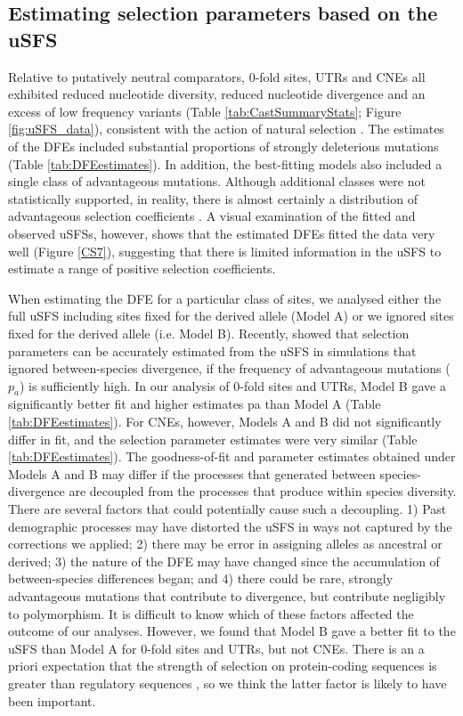 \subsection{Estimating selection parameters based on the uSFS}

	Relative to putatively neutral comparators, 0-fold sites, UTRs and CNEs all exhibited reduced nucleotide diversity, reduced nucleotide divergence and an excess of low frequency variants (Table \ref{tab:CastSummaryStats}; Figure \ref{fig:uSFS_data}), consistent with the action of natural selection \citep{RN158, RN122}. The estimates of the DFEs included substantial proportions of strongly deleterious mutations (Table \ref{tab:DFEestimates}). In addition, the best-fitting models also included a single class of advantageous mutations. Although additional classes were not statistically supported, in reality, there is almost certainly a distribution of advantageous selection coefficients \citep{RN181, RN345}. A visual examination of the fitted and observed uSFSs, however, shows that the estimated DFEs fitted the data very well (Figure \ref{CS7}), suggesting that there is limited information in the uSFS to estimate a range of positive selection coefficients. 

	When estimating the DFE for a particular class of sites, we analysed either the full uSFS including sites fixed for the derived allele (Model A) or we ignored sites fixed for the derived allele (i.e. Model B). Recently,\cite{RN354} showed that selection parameters can be accurately estimated from the uSFS in simulations that ignored between-species divergence, if the frequency of advantageous mutations ($p_a$) is sufficiently high. In our analysis of 0-fold sites and UTRs, Model B gave a significantly better fit and higher estimates pa than Model A (Table \ref{tab:DFEestimates}). For CNEs, however, Models A and B did not significantly differ in fit, and the selection parameter estimates were very similar (Table \ref{tab:DFEestimates}). The goodness-of-fit and parameter estimates obtained under Models A and B may differ if the processes that generated between species-divergence are decoupled from the processes that produce within species diversity. There are several factors that could potentially cause such a decoupling. 1) Past demographic processes may have distorted the uSFS in ways not captured by the corrections we applied; 2) there may be error in assigning alleles as ancestral or derived; 3) the nature of the DFE may have changed since the accumulation of between-species differences began; and 4) there could be rare, strongly advantageous mutations that contribute to divergence, but contribute negligibly to polymorphism. It is difficult to know which of these factors affected the outcome of our analyses. However, we found that Model B gave a better fit to the uSFS than Model A for 0-fold sites and UTRs, but not CNEs. There is an a priori expectation that the strength of selection on protein-coding sequences is greater than regulatory sequences \cite{RN122}, so we think the latter factor is likely to have been important. 

